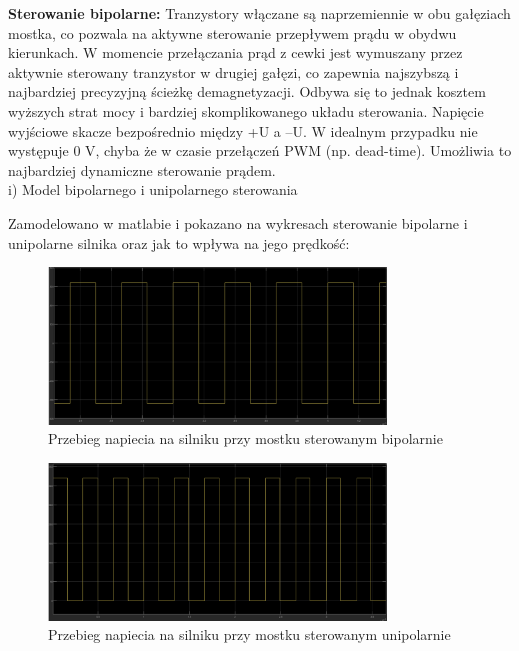 \documentclass[11pt]{article}
\begin{document}
\textbf{Sterowanie bipolarne:}
Tranzystory włączane są naprzemiennie w obu gałęziach mostka, co pozwala na aktywne sterowanie przepływem prądu w obydwu kierunkach. W momencie przełączania prąd z cewki jest wymuszany przez aktywnie sterowany tranzystor w drugiej gałęzi, co zapewnia najszybszą i najbardziej precyzyjną ścieżkę demagnetyzacji. Odbywa się to jednak kosztem wyższych strat mocy i bardziej skomplikowanego układu sterowania.
Napięcie wyjściowe skacze bezpośrednio między +U a –U. W idealnym przypadku nie występuje 0 V, chyba że w czasie przełączeń PWM (np. dead-time). Umożliwia to najbardziej dynamiczne sterowanie prądem.\\

i) Model bipolarnego i unipolarnego sterowania

Zamodelowano w matlabie i pokazano na wykresach sterowanie bipolarne i unipolarne silnika oraz jak to wpływa na jego prędkość:\\

\begin{figure}[H]
\centering
\includegraphics[width=0.8\textwidth]{aun1_bipolar_bridge.png}
\caption{Przebieg napiecia na silniku przy mostku sterowanym bipolarnie}
\end{figure}

\begin{figure}[H]
\centering
\includegraphics[width=0.8\textwidth]{aun1_unipolar_bridge.png}
\caption{Przebieg napiecia na silniku przy mostku sterowanym unipolarnie}
\end{figure}
\end{document}
